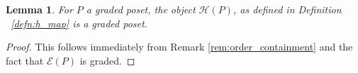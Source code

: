 \documentclass[10 pt]{amsart}
\theoremstyle{plain}
\newtheorem{lem}[thm]{Lemma}
\theoremstyle{definition}
\theoremstyle{remark}
\numberwithin{equation}{section}
\begin{document}
\begin{lem}\label{lem:HP_order}
For $P$ a graded poset, the object $\mathcal{H}(P)$, as defined in Definition ~\ref{defn:h_map} is a graded poset.
\end{lem}

\begin{proof}
This follows immediately from Remark \ref{rem:order_containment} and the fact that $\mathcal E(P)$ is graded.
\end{proof}

\end{document}
